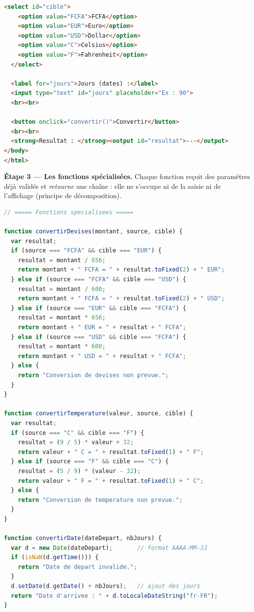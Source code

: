 \documentclass[11pt]{article}
\begin{document}
\begin{exoresolu}
\begin{lstlisting}[language=HTML]
  <select id="cible">
    <option value="FCFA">FCFA</option>
    <option value="EUR">Euro</option>
    <option value="USD">Dollar</option>
    <option value="C">Celsius</option>
    <option value="F">Fahrenheit</option>
  </select>

  <label for="jours">Jours (dates) :</label>
  <input type="text" id="jours" placeholder="Ex : 90">
  <br><br>

  <button onclick="convertir()">Convertir</button>
  <br><br>
  <strong>Resultat : </strong><output id="resultat">---</output>
</body>
</html>
\end{lstlisting}

\textbf{Étape 3 — Les fonctions spécialisées.} Chaque fonction reçoit des paramètres déjà validés et \emph{retourne} une chaîne : elle ne s'occupe ni de la saisie ni de l'affichage (principe de décomposition).

\begin{lstlisting}[language=JavaScript]
// ===== Fonctions specialisees =====

function convertirDevises(montant, source, cible) {
  var resultat;
  if (source === "FCFA" && cible === "EUR") {
    resultat = montant / 656;
    return montant + " FCFA = " + resultat.toFixed(2) + " EUR";
  } else if (source === "FCFA" && cible === "USD") {
    resultat = montant / 600;
    return montant + " FCFA = " + resultat.toFixed(2) + " USD";
  } else if (source === "EUR" && cible === "FCFA") {
    resultat = montant * 656;
    return montant + " EUR = " + resultat + " FCFA";
  } else if (source === "USD" && cible === "FCFA") {
    resultat = montant * 600;
    return montant + " USD = " + resultat + " FCFA";
  } else {
    return "Conversion de devises non prevue.";
  }
}

function convertirTemperature(valeur, source, cible) {
  var resultat;
  if (source === "C" && cible === "F") {
    resultat = (9 / 5) * valeur + 32;
    return valeur + " C = " + resultat.toFixed(1) + " F";
  } else if (source === "F" && cible === "C") {
    resultat = (5 / 9) * (valeur - 32);
    return valeur + " F = " + resultat.toFixed(1) + " C";
  } else {
    return "Conversion de temperature non prevue.";
  }
}

function convertirDate(dateDepart, nbJours) {
  var d = new Date(dateDepart);       // format AAAA-MM-JJ
  if (isNaN(d.getTime())) {
    return "Date de depart invalide.";
  }
  d.setDate(d.getDate() + nbJours);   // ajout des jours
  return "Date d'arrivee : " + d.toLocaleDateString("fr-FR");
}
\end{lstlisting}


\end{exoresolu}
\end{document}
